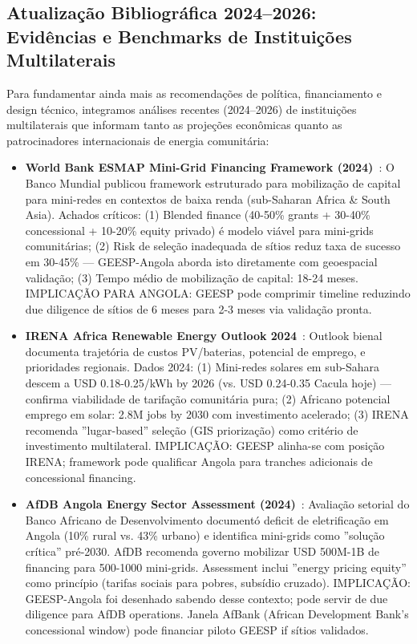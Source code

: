 \documentclass[12pt, a4paper]{article}
\begin{document}
{{{{{{{{{{{{\subsection{Atualização Bibliográfica 2024--2026: Evidências e Benchmarks de Instituições Multilaterais}

Para fundamentar ainda mais as recomendações de política, financiamento e design técnico, integramos análises recentes (2024--2026) de instituições multilaterais que informam tanto as projeções econômicas quanto as patrocinadores internacionais de energia comunitária:

\begin{itemize}

  \item \textbf{World Bank ESMAP Mini-Grid Financing Framework (2024)}~\citep{WorldBank2024}: O Banco Mundial publicou framework estruturado para mobilização de capital para mini-redes en contextos de baixa renda (sub-Saharan Africa & South Asia). Achados críticos: (1) Blended finance (40-50\% grants + 30-40\% concessional + 10-20\% equity privado) é modelo viável para mini-grids comunitárias; (2) Risk de seleção inadequada de sítios reduz taxa de sucesso em 30-45\% — GEESP-Angola aborda isto diretamente com geoespacial validação; (3) Tempo médio de mobilização de capital: 18-24 meses. IMPLICAÇÃO PARA ANGOLA: GEESP pode comprimir timeline reduzindo due diligence de sítios de 6 meses para 2-3 meses via validação pronta.
  
  \item \textbf{IRENA Africa Renewable Energy Outlook 2024}~\citep{IRENA2024}: Outlook bienal documenta trajetória de custos PV/baterias, potencial de emprego, e prioridades regionais. Dados 2024: (1) Mini-redes solares em sub-Sahara descem a USD 0.18-0.25/kWh by 2026 (vs. USD 0.24-0.35 Cacula hoje) — confirma viabilidade de tarifação comunitária pura; (2) Africano potencial emprego em solar: 2.8M jobs by 2030 com investimento acelerado; (3) IRENA recomenda ''lugar-based'' seleção (GIS priorização) como critério de investimento multilateral. IMPLICAÇÃO: GEESP alinha-se com posição IRENA; framework pode qualificar Angola para tranches adicionais de concessional financing.
  
  \item \textbf{AfDB Angola Energy Sector Assessment (2024)}~\citep{AfDB2024}: Avaliação setorial do Banco Africano de Desenvolvimento documentó deficit de eletrificação em Angola (10\% rural vs. 43\% urbano) e identifica mini-grids como ''solução crítica'' pré-2030. AfDB recomenda governo mobilizar USD 500M-1B de financing para 500-1000 mini-grids. Assessment inclui ''energy pricing equity'' como princípio (tarifas sociais para pobres, subsídio cruzado). IMPLICAÇÃO: GEESP-Angola foi desenhado sabendo desse contexto; pode servir de due diligence para AfDB operations. Janela AfBank (African Development Bank's concessional window) pode financiar piloto GEESP if sítios validados.
  

\end{itemize}}}}}}}}}}}}}
\end{document}

